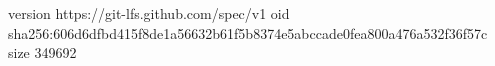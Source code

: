 version https://git-lfs.github.com/spec/v1
oid sha256:606d6dfbd415f8de1a56632b61f5b8374e5abccade0fea800a476a532f36f57c
size 349692
